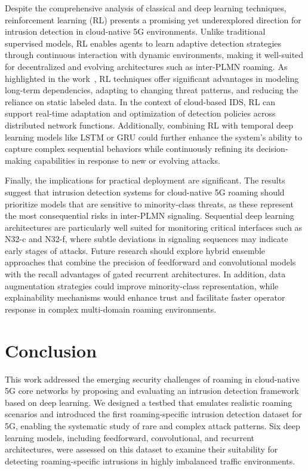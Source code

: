 \documentclass[journal,article,submit,moreauthors,pdftex]{Definitions/tsp}
\begin{document}
Despite the comprehensive analysis of classical and deep learning techniques, reinforcement learning (RL) presents a promising yet underexplored direction for intrusion detection in cloud-native 5G environments. Unlike traditional supervised models, RL enables agents to learn adaptive detection strategies through continuous interaction with dynamic environments, making it well-suited for decentralized and evolving architectures such as inter-PLMN roaming. As highlighted in the work~\cite{kheddarReinforcementLearningBasedIntrusionDetection2025}, RL techniques offer significant advantages in modeling long-term dependencies, adapting to changing threat patterns, and reducing the reliance on static labeled data. In the context of cloud-based IDS, RL can support real-time adaptation and optimization of detection policies across distributed network functions. Additionally, combining RL with temporal deep learning models like LSTM or GRU could further enhance the system’s ability to capture complex sequential behaviors while continuously refining its decision-making capabilities in response to new or evolving attacks. 

Finally, the implications for practical deployment are significant. The results suggest that intrusion detection systems for cloud-native 5G roaming should prioritize models that are sensitive to minority-class threats, as these represent the most consequential risks in inter-PLMN signaling. Sequential deep learning architectures are particularly well suited for monitoring critical interfaces such as N32-c and N32-f, where subtle deviations in signaling sequences may indicate early stages of attacks. Future research should explore hybrid ensemble approaches that combine the precision of feedforward and convolutional models with the recall advantages of gated recurrent architectures. In addition, data augmentation strategies could improve minority-class representation, while explainability mechanisms would enhance trust and facilitate faster operator response in complex multi-domain roaming environments.


\section{Conclusion}

This work addressed the emerging security challenges of roaming in cloud-native 5G core networks by proposing and evaluating an intrusion detection framework based on deep learning. We designed a testbed that emulates realistic roaming scenarios and introduced the first roaming-specific intrusion detection dataset for 5G, enabling the systematic study of rare and complex attack patterns. Six deep learning models, including feedforward, convolutional, and recurrent architectures, were assessed on this dataset to examine their suitability for detecting roaming-specific intrusions in highly imbalanced traffic environments.
\end{document}
